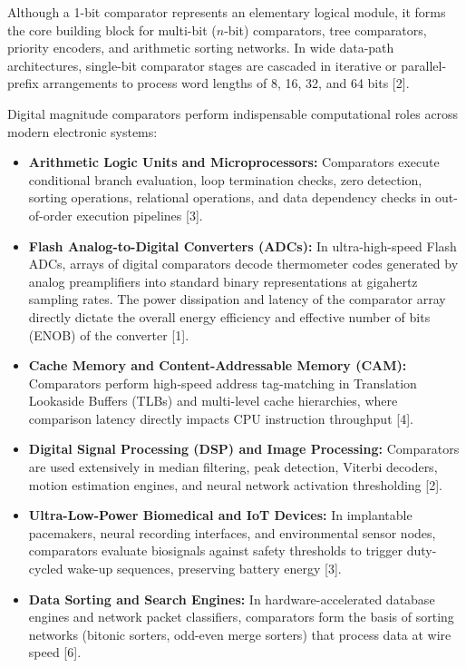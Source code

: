 \documentclass[12pt,a4paper,oneside]{report}
\begin{document}
Although a 1-bit comparator represents an elementary logical module, it forms the core building block for multi-bit ($n$-bit) comparators, tree comparators, priority encoders, and arithmetic sorting networks. In wide data-path architectures, single-bit comparator stages are cascaded in iterative or parallel-prefix arrangements to process word lengths of 8, 16, 32, and 64 bits [2].

Digital magnitude comparators perform indispensable computational roles across modern electronic systems:
\begin{itemize}
\item \textbf{Arithmetic Logic Units and Microprocessors:} Comparators execute conditional branch evaluation, loop termination checks, zero detection, sorting operations, relational operations, and data dependency checks in out-of-order execution pipelines [3].
\item \textbf{Flash Analog-to-Digital Converters (ADCs):} In ultra-high-speed Flash ADCs, arrays of digital comparators decode thermometer codes generated by analog preamplifiers into standard binary representations at gigahertz sampling rates. The power dissipation and latency of the comparator array directly dictate the overall energy efficiency and effective number of bits (ENOB) of the converter [1].
\item \textbf{Cache Memory and Content-Addressable Memory (CAM):} Comparators perform high-speed address tag-matching in Translation Lookaside Buffers (TLBs) and multi-level cache hierarchies, where comparison latency directly impacts CPU instruction throughput [4].
\item \textbf{Digital Signal Processing (DSP) and Image Processing:} Comparators are used extensively in median filtering, peak detection, Viterbi decoders, motion estimation engines, and neural network activation thresholding [2].
\item \textbf{Ultra-Low-Power Biomedical and IoT Devices:} In implantable pacemakers, neural recording interfaces, and environmental sensor nodes, comparators evaluate biosignals against safety thresholds to trigger duty-cycled wake-up sequences, preserving battery energy [3].
\item \textbf{Data Sorting and Search Engines:} In hardware-accelerated database engines and network packet classifiers, comparators form the basis of sorting networks (bitonic sorters, odd-even merge sorters) that process data at wire speed [6].
\end{itemize}
\end{document}
